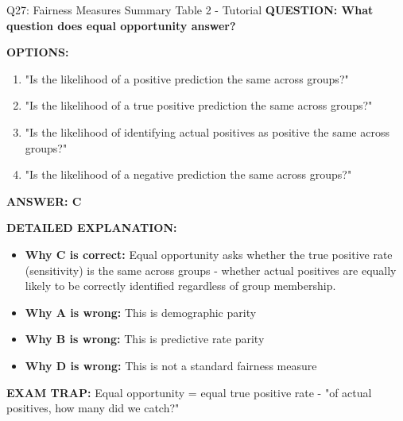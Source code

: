 \documentclass[8pt]{beamer}
\begin{document}
	\begin{frame}{Q27: Fairness Measures Summary Table 2 - Tutorial}
		\fontsize{6.5}{7.5}\selectfont
		\textbf{QUESTION: What question does equal opportunity answer?}
		
		\vspace{0.1cm}
		\textbf{OPTIONS:}
		\begin{enumerate}
			\item "Is the likelihood of a positive prediction the same across groups?"
			\item "Is the likelihood of a true positive prediction the same across groups?"
			\item "Is the likelihood of identifying actual positives as positive the same across groups?"
			\item "Is the likelihood of a negative prediction the same across groups?"
		\end{enumerate}
		
		\vspace{0.1cm}
		\textcolor{myblue}{\textbf{ANSWER: C}}
		
		\vspace{0.1cm}
		\textbf{DETAILED EXPLANATION:}
		\begin{itemize}
			\item \textbf{Why C is correct:} Equal opportunity asks whether the true positive rate (sensitivity) is the same across groups - whether actual positives are equally likely to be correctly identified regardless of group membership.
			\item \textbf{Why A is wrong:} This is demographic parity
			\item \textbf{Why B is wrong:} This is predictive rate parity
			\item \textbf{Why D is wrong:} This is not a standard fairness measure
		\end{itemize}
		
		\textcolor{myred}{\textbf{EXAM TRAP:}} Equal opportunity = \textcolor{myblue}{equal true positive rate} - "of actual positives, how many did we catch?"
	\end{frame}
	
\end{document}

